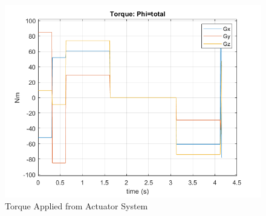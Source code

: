 \documentclass[letterpaper, preprint, paper,11pt]{AAS}	%
\begin{document}
			\begin{figure}[H]
				\label{fig:torque_total_alpha0}
				\begin{center}
					\includegraphics[width=4.5in]{figures/alpha0/torque.png}
				\end{center}
				\caption{Torque Applied from Actuator System}
			\end{figure}
			
			
			
	
\end{document}
